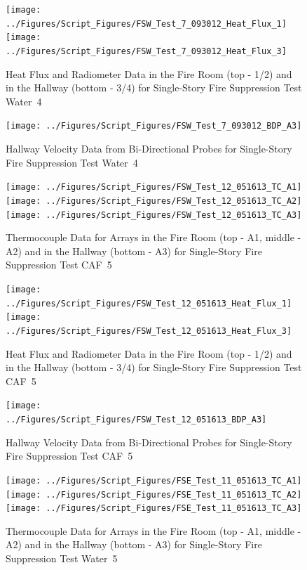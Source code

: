 \documentclass[12pt,oneside]{book}
\begin{document}
\begin{figure}[ht]
\texttt{[image: ../Figures/Script\_Figures/FSW\_Test\_7\_093012\_Heat\_Flux\_1]}
\texttt{[image: ../Figures/Script\_Figures/FSW\_Test\_7\_093012\_Heat\_Flux\_3]}
\caption{Heat Flux and Radiometer Data in the Fire Room (top - 1/2) and in the Hallway (bottom - 3/4) for Single-Story Fire Suppression Test Water~4}
\end{figure}

\begin{figure}[ht]
\texttt{[image: ../Figures/Script\_Figures/FSW\_Test\_7\_093012\_BDP\_A3]}
\caption{Hallway Velocity Data from Bi-Directional Probes for Single-Story Fire Suppression Test Water~4}
\end{figure}

\begin{figure}[ht]
\texttt{[image: ../Figures/Script\_Figures/FSW\_Test\_12\_051613\_TC\_A1]}
\texttt{[image: ../Figures/Script\_Figures/FSW\_Test\_12\_051613\_TC\_A2]}
\texttt{[image: ../Figures/Script\_Figures/FSW\_Test\_12\_051613\_TC\_A3]}
\caption{Thermocouple Data for Arrays in the Fire Room (top - A1, middle - A2) and in the Hallway (bottom - A3) for Single-Story Fire Suppression Test CAF~5}
\end{figure}

\begin{figure}[ht]
\texttt{[image: ../Figures/Script\_Figures/FSW\_Test\_12\_051613\_Heat\_Flux\_1]}
\texttt{[image: ../Figures/Script\_Figures/FSW\_Test\_12\_051613\_Heat\_Flux\_3]}
\caption{Heat Flux and Radiometer Data in the Fire Room (top - 1/2) and in the Hallway (bottom - 3/4) for Single-Story Fire Suppression Test CAF~5}
\end{figure}

\begin{figure}[ht]
\texttt{[image: ../Figures/Script\_Figures/FSW\_Test\_12\_051613\_BDP\_A3]}
\caption{Hallway Velocity Data from Bi-Directional Probes for Single-Story Fire Suppression Test CAF~5}
\end{figure}

\begin{figure}[ht]
\texttt{[image: ../Figures/Script\_Figures/FSE\_Test\_11\_051613\_TC\_A1]}
\texttt{[image: ../Figures/Script\_Figures/FSE\_Test\_11\_051613\_TC\_A2]}
\texttt{[image: ../Figures/Script\_Figures/FSE\_Test\_11\_051613\_TC\_A3]}
\caption{Thermocouple Data for Arrays in the Fire Room (top - A1, middle - A2) and in the Hallway (bottom - A3) for Single-Story Fire Suppression Test Water~5}
\end{figure}
\end{document}
